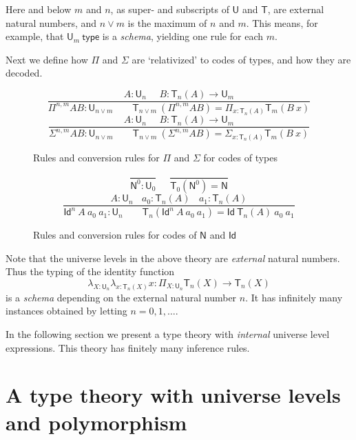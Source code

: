 \documentclass[11pt,a4paper]{article}
\theoremstyle{definition}
\newcommand{\Id}{\mathsf{Id}}
\newcommand{\NN}{\mathsf{N}}
\newcommand{\UU}{\mathsf{U}}
\newcommand{\type}{\mathsf{type}}
\newcommand{\mypi}[3]{\Pi_{#1:#2}#3}
\newcommand{\mylam}[3]{\lambda_{#1:#2}#3}
\newcommand{\mysig}[3]{\Sigma_{#1:#2}#3}
\newcommand{\N}{\mathsf{N}}
\newcommand{\T}{\mathsf{T}}
\begin{document}
Here and below $m$ and $n$, as super- and subscripts of $\UU$ and $\T$,
are external natural numbers, and $n \vee m$ is the 
maximum of $n$ and $m$. This means, for example, that $\UU_m~\type$ is 
a \emph{schema}, yielding one rule for each $m$.

Next we define how $\Pi$ and $\Sigma$ are `relativized' to
codes of types, and how they are decoded.

\begin{figure}[H]
  \caption{Rules and conversion rules for $\Pi$ and $\Sigma$ for codes of types}\label{fig:PiSigU}
$$
\frac{A:\UU_{n}~~~~~~B:\T_{n}(A)\rightarrow \UU_{m}}
     {\Pi^{n,m} A B:\UU_{n\vee m}~~~~~~~~~
      \T_{n\vee m}~(\Pi^{n,m} A B) = \mypi{x}{\T_{n}(A)}{ \T_{m}(B~x)}}
$$
$$
\frac{A:\UU_{n}~~~~~~B:\T_{n}(A)\rightarrow \UU_{m}}
     {\Sigma^{n,m} A B:\UU_{n\vee m}~~~~~~~~~
     \T_{n\vee m}~(\Sigma^{n,m} A B) = \mysig {x}{\T_{n}(A)}{ \T_{m}(B~x)}}
$$
\end{figure}

\begin{figure}[H]
\caption{Rules and conversion rules for codes of $\N$ and $\Id$}\label{fig:NIdSigU}
$$
\frac{}{\NN^{0}:\UU_{0}}~~~~~~\frac{}{\T_{0}(\NN^{0}) = \NN}
$$
$$
\frac{A:\UU_n~~~~a_0:\T_n(A)~~~~a_1:\T_n(A)}
{\Id^n~A~a_0~a_1:\UU_n ~~~~~~~~~ \T_n(\Id^n~A~a_0~a_1) = \Id~\T_n(A)~a_0~a_1 }
$$
\end{figure}


Note that the universe levels in the above theory are {\em external} natural numbers. Thus the typing of the identity function 
$$\mylam{X}{\UU_n}{\mylam{x}{\T_n(X)}{x}} : \mypi{X}{\UU_n}{\T_n(X)\rightarrow \T_n(X)}$$ 
is a {\em schema}  depending on the external natural number $n$. It has infinitely many instances obtained by letting  $n = 0,1,\dots$. 

In the following section we present a type theory with {\em internal} universe level expressions. This theory has finitely many inference rules.

 \section{A type theory with universe levels and polymorphism }\label{sec:internal}
\end{document}
